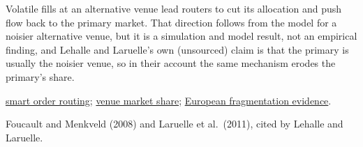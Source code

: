 \begin{qfmodel}
 Volatile fills at an alternative venue lead routers to cut its allocation and push flow back to the primary market. That direction follows from the model for a noisier alternative venue, but it is a simulation and model result, not an empirical finding, and Lehalle and Laruelle's own (unsourced) claim is that the primary is usually the noisier venue, so in their account the same mechanism erodes the primary's share.

 \hyperref[def:smart-order-routing]{smart order routing}; \hyperref[meth:venue-market-share]{venue market share}; \hyperref[ev:european-fragmentation-evidence]{European fragmentation evidence}.

 Foucault and Menkveld (2008) and Laruelle et al.\ (2011), cited by Lehalle and Laruelle.

\end{qfmodel}

